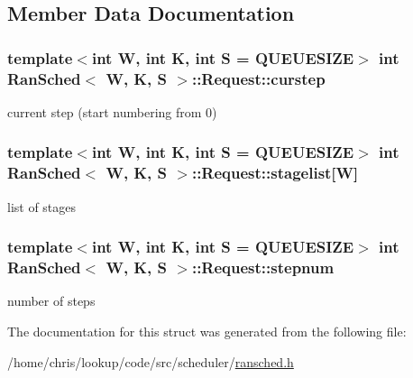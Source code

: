 \subsection{Member Data Documentation}
\hypertarget{structRanSched_1_1Request_ad43ebb667d1ca49c3e55a002ac97a98a}{
\subsubsection[{curstep}]{\setlength{\rightskip}{0pt plus 5cm}template$<$int W, int K, int S = Q\-U\-E\-U\-E\-S\-I\-Z\-E$>$ int {\bf Ran\-Sched}$<$ {\bf W}, K, S $>$\-::Request\-::curstep}}\label{structRanSched_1_1Request_ad43ebb667d1ca49c3e55a002ac97a98a}


current step (start numbering from 0) 

\hypertarget{structRanSched_1_1Request_a033a82891f624a31b06bd5d5878a5901}{
\subsubsection[{stagelist}]{\setlength{\rightskip}{0pt plus 5cm}template$<$int W, int K, int S = Q\-U\-E\-U\-E\-S\-I\-Z\-E$>$ int {\bf Ran\-Sched}$<$ {\bf W}, K, S $>$\-::Request\-::stagelist\mbox{[}{\bf W}\mbox{]}}}\label{structRanSched_1_1Request_a033a82891f624a31b06bd5d5878a5901}


list of stages 

\hypertarget{structRanSched_1_1Request_a4c27e0f3554eb44342f5fdbfe5811499}{
\subsubsection[{stepnum}]{\setlength{\rightskip}{0pt plus 5cm}template$<$int W, int K, int S = Q\-U\-E\-U\-E\-S\-I\-Z\-E$>$ int {\bf Ran\-Sched}$<$ {\bf W}, K, S $>$\-::Request\-::stepnum}}\label{structRanSched_1_1Request_a4c27e0f3554eb44342f5fdbfe5811499}


number of steps 



The documentation for this struct was generated from the following file\-:\begin{DoxyCompactItemize}
\item 
/home/chris/lookup/code/src/scheduler/\hyperlink{ransched_8h}{ransched.\-h}\end{DoxyCompactItemize}
